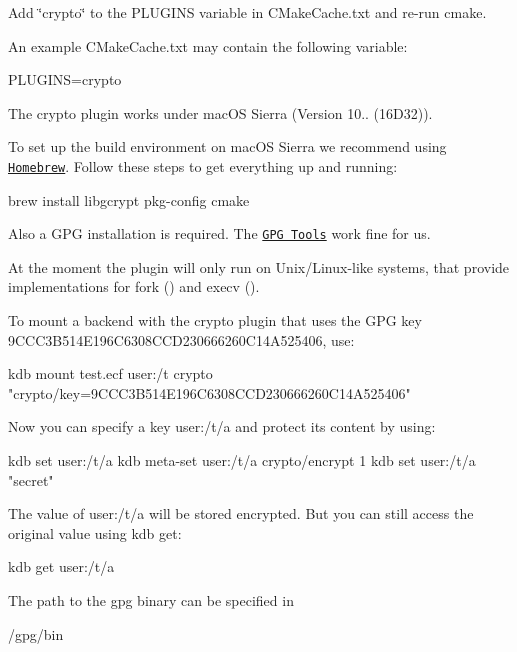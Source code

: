 Add \char`\"{}crypto\char`\"{} to the {\ttfamily P\+L\+U\+G\+I\+NS} variable in {\ttfamily C\+Make\+Cache.\+txt} and re-\/run {\ttfamily cmake}.

An example {\ttfamily C\+Make\+Cache.\+txt} may contain the following variable\+:


\begin{DoxyCode}
PLUGINS=crypto
\end{DoxyCode}


The crypto plugin works under mac\+OS Sierra (Version 10.. (16\+D32)).

To set up the build environment on mac\+OS Sierra we recommend using \href{http://brew.sh/}{\tt Homebrew}. Follow these steps to get everything up and running\+:


\begin{DoxyCode}
brew install libgcrypt pkg-config cmake
\end{DoxyCode}


Also a G\+PG installation is required. The \href{https://gpgtools.org}{\tt G\+PG Tools} work fine for us.

At the moment the plugin will only run on Unix/\+Linux-\/like systems, that provide implementations for {\ttfamily fork ()} and {\ttfamily execv ()}.

To mount a backend with the crypto plugin that uses the G\+PG key 9\+C\+C\+C3\+B514\+E196\+C6308\+C\+C\+D230666260\+C14\+A525406, use\+:


\begin{DoxyCode}
kdb mount test.ecf user:/t crypto "crypto/key=9CCC3B514E196C6308CCD230666260C14A525406"
\end{DoxyCode}


Now you can specify a key {\ttfamily user\+:/t/a} and protect its content by using\+:


\begin{DoxyCode}
kdb set user:/t/a
kdb meta-set user:/t/a crypto/encrypt 1
kdb set user:/t/a "secret"
\end{DoxyCode}


The value of {\ttfamily user\+:/t/a} will be stored encrypted. But you can still access the original value using {\ttfamily kdb get}\+:


\begin{DoxyCode}
kdb get user:/t/a
\end{DoxyCode}


The path to the gpg binary can be specified in


\begin{DoxyCode}
/gpg/bin
\end{DoxyCode}


